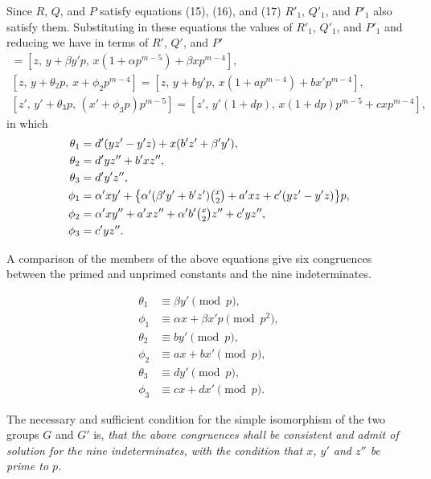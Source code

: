 \documentclass[oneside]{article}
\begin{document}
Since $R$, $Q$, and $P$ satisfy equations (15), (16), and (17) $R'_1$,
$Q'_1$, and $P'_1$ also satisfy them. Substituting in these equations the
values of $R'_1$, $Q'_1$, and $P'_1$ and reducing we have in terms of
$R'$, $Q'$, and $P'$
\begin{gather}
[z,\, y + \theta_1 p,\, x + \phi_1 p^{m-5}] =
  [z,\, y + \beta y'p,\, x(1 + \alpha p^{m-5}) + \beta xp^{m-4}], \\ %
[z,\, y + \theta_2 p,\, x + \phi_2 p^{m-4}] =
  [z,\, y + by'p,\, x(1 + ap^{m-4}) + bx'p^{m-4}], \\ %
[z',\, y' + \theta_3 p,\, (x' + \phi_3 p)p^{m-5}] =
  [z',\, y'(1 + dp),\, x(1 + dp)p^{m-5} + cxp^{m-4}],                %
\end{gather}
\noindent in which
\begin{align*}
\theta_1 &= d'(yz' - y'z) + x(b'z' + \beta'y'), \\
\theta_2 &= d'yz'' + b'xz'', \\
\theta_3 &= d'y'z'', \\
\phi_1 &= \alpha'xy' + \bigl\{\alpha'(\beta'y' + b'z')\tbinom{x}{2} +
  a'xz + c'(yz'-y'z)\bigr\}p, \\
\phi_2 &= \alpha'xy'' + a'xz'' + \alpha'b'\tbinom{x}{2}z'' + c'yz'', \\
\phi_3 &= c'yz''.
\end{align*}

A comparison of the members of the above equations give six congruences
between the primed and unprimed constants and the nine indeterminates.

\begin{align*}
\theta_1 &\equiv \beta y' \pmod{p},                \tag{I} \\
\phi_1   &\equiv \alpha x + \beta x'p \pmod{p^2},  \tag{II} \\
\theta_2 &\equiv by' \pmod{p},                     \tag{III} \\
\phi_2   &\equiv ax + bx' \pmod{p},                \tag{IV} \\
\theta_3 &\equiv dy' \pmod{p},                     \tag{V} \\
\phi_3   &\equiv cx + dx' \pmod{p}.                \tag{VI}
\end{align*}

The necessary and sufficient condition for the simple isomorphism of
the two groups $G$ and $G'$ is, \textit{that the above congruences shall be
consistent and admit of solution for the nine indeterminates, with the
condition that $x$, $y'$ and $z''$ be prime to $p$.}
\end{document}
